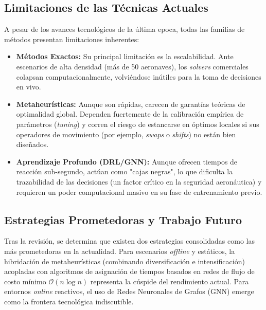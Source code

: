 \documentclass[letter, 10pt]{article}
\begin{document}
\subsection{Limitaciones de las T\'ecnicas Actuales}
A pesar de los avances tecnol\'ogicos de la \'ultima epoca, todas las familias de m\'etodos presentan limitaciones inherentes:
\begin{itemize}
    \item \textbf{M\'etodos Exactos:} Su principal limitaci\'on es la escalabilidad. Ante escenarios de alta densidad (m\'as de 50 aeronaves), los \textit{solvers} comerciales colapsan computacionalmente, volvi\'endose in\'utiles para la toma de decisiones en vivo.
    \item \textbf{Metaheur\'isticas:} Aunque son r\'apidas, carecen de garant\'ias te\'oricas de optimalidad global. Dependen fuertemente de la calibraci\'on emp\'irica de par\'ametros (\textit{tuning}) y corren el riesgo de estancarse en \'optimos locales si sus operadores de movimiento (por ejemplo, \textit{swaps} o \textit{shifts}) no est\'an bien dise\~nados.
    \item \textbf{Aprendizaje Profundo (DRL/GNN):} Aunque ofrecen tiempos de reacci\'on sub-segundo, act\'uan como "cajas negras", lo que dificulta la trazabilidad de las decisiones (un factor cr\'itico en la seguridad aeron\'autica) y requieren un poder computacional masivo en su fase de entrenamiento previo.
\end{itemize}

\subsection{Estrategias Prometedoras y Trabajo Futuro}
Tras la revisi\'on, se determina que existen dos estrategias consolidadas como las m\'as prometedoras en la actualidad. Para escenarios \textit{offline} y est\'aticos, la hibridaci\'on de metaheur\'isticas (combinando diversificaci\'on e intensificaci\'on) acopladas con algoritmos de asignaci\'on de tiempos basados en redes de flujo de costo m\'inimo $\mathcal{O}(n \log n)$ representa la c\'uspide del rendimiento actual. Para entornos \textit{online} reactivos, el uso de Redes Neuronales de Grafos (GNN) emerge como la frontera tecnol\'ogica indiscutible.
\end{document}
